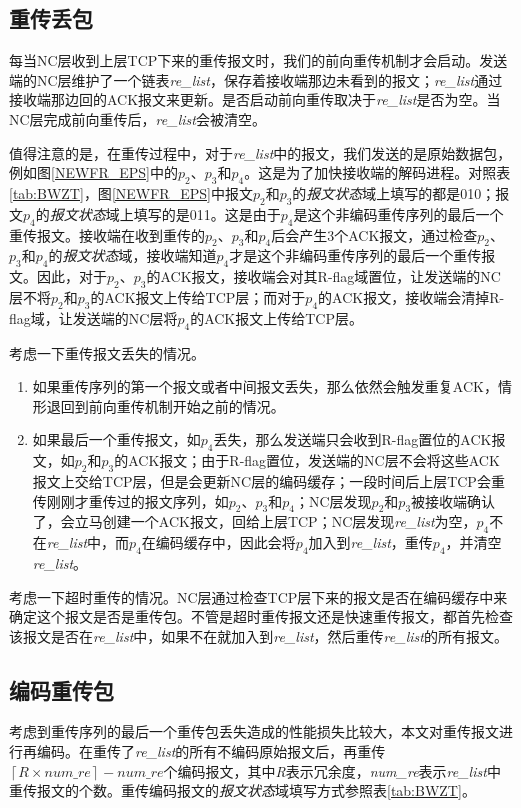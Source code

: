\subsection{重传丢包}
每当NC层收到上层TCP下来的重传报文时，我们的前向重传机制才会启动。发送端的NC层维护了一个链表\emph{re\_list}，保存着接收端那边未看到的报文；\emph{re\_list}通过接收端那边回的ACK报文来更新。是否启动前向重传取决于\emph{re\_list}是否为空。当NC层完成前向重传后，\emph{re\_list}会被清空。
\par
值得注意的是，在重传过程中，对于\emph{re\_list}中的报文，我们发送的是原始数据包，例如图\ref{NEWFR_EPS}中的$p_2$、$p_3$和$p_4$。这是为了加快接收端的解码进程。对照表\ref{tab:BWZT}，图\ref{NEWFR_EPS}中报文$p_2$和$p_3$的\emph{报文状态}域上填写的都是010；报文$p_4$的\emph{报文状态}域上填写的是011。这是由于$p_4$是这个非编码重传序列的最后一个重传报文。接收端在收到重传的$p_2$、$p_3$和$p_4$后会产生3个ACK报文，通过检查$p_2$、$p_3$和$p_4$的\emph{报文状态}域，接收端知道$p_4$才是这个非编码重传序列的最后一个重传报文。因此，对于$p_2$、$p_3$的ACK报文，接收端会对其R-flag域置位，让发送端的NC层不将$p_2$和$p_3$的ACK报文上传给TCP层；而对于$p_4$的ACK报文，接收端会清掉R-flag域，让发送端的NC层将$p_4$的ACK报文上传给TCP层。
\par
考虑一下重传报文丢失的情况。
\begin{enumerate}[fullwidth,itemindent=2em,label=(\arabic*)]
	\item 如果重传序列的第一个报文或者中间报文丢失，那么依然会触发重复ACK，情形退回到前向重传机制开始之前的情况。
	\item 如果最后一个重传报文，如$p_4$丢失，那么发送端只会收到R-flag置位的ACK报文，如$p_2$和$p_3$的ACK报文；由于R-flag置位，发送端的NC层不会将这些ACK报文上交给TCP层，但是会更新NC层的编码缓存；一段时间后上层TCP会重传刚刚才重传过的报文序列，如$p_2$、$p_3$和$p_4$；NC层发现$p_2$和$p_3$被接收端确认了，会立马创建一个ACK报文，回给上层TCP；NC层发现\emph{re\_list}为空，$p_4$不在\emph{re\_list}中，而$p_4$在编码缓存中，因此会将$p_4$加入到\emph{re\_list}，重传$p_4$，并清空\emph{re\_list}。
\end{enumerate}
\par
考虑一下超时重传的情况。NC层通过检查TCP层下来的报文是否在编码缓存中来确定这个报文是否是重传包。不管是超时重传报文还是快速重传报文，都首先检查该报文是否在\emph{re\_list}中，如果不在就加入到\emph{re\_list}，然后重传\emph{re\_list}的所有报文。
\subsection{编码重传包}
考虑到重传序列的最后一个重传包丢失造成的性能损失比较大，本文对重传报文进行再编码。在重传了\emph{re\_list}的所有不编码原始报文后，再重传$\left\lceil {R \times num\_re} \right\rceil  - num\_re$个编码报文，其中\emph{R}表示冗余度，\emph{num\_re}表示\emph{re\_list}中重传报文的个数。重传编码报文的\emph{报文状态}域填写方式参照表\ref{tab:BWZT}。
